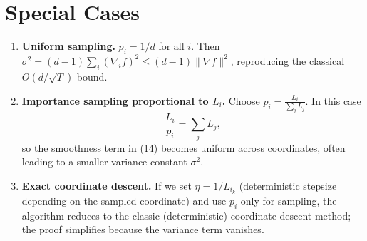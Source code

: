 \documentclass{article}
\begin{document}
\section*{Special Cases}
\begin{enumerate}[label=\alph*)]
\item \textbf{Uniform sampling.} $p_i=1/d$ for all $i$.  Then $\sigma^{2}= (d-1)\sum_i (\nabla_i f)^{2}\le (d-1)\|\nabla f\|^{2}$, reproducing the classical $O(d/\sqrt{T})$ bound.
\item \textbf{Importance sampling proportional to $L_i$.} Choose $p_i = \frac{L_i}{\sum_j L_j}$.  In this case
\[
\frac{L_i}{p_i}= \sum_{j}L_j,
\]
so the smoothness term in (14) becomes uniform across coordinates, often leading to a smaller variance constant $\sigma^{2}$.
\item \textbf{Exact coordinate descent.} If we set $\eta=1/L_{i_k}$ (deterministic stepsize depending on the sampled coordinate) and use $p_i$ only for sampling, the algorithm reduces to the classic (deterministic) coordinate descent method; the proof simplifies because the variance term vanishes.
\end{enumerate}
\end{document}
